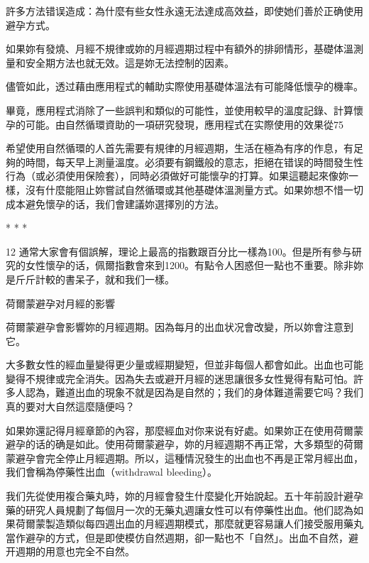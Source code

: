 \documentclass[12pt,UTF8]{ctexbook}
\begin{document}
許多方法错误造成：為什麼有些女性永遠无法達成高效益，即使她们善於正确使用避孕方式。

如果妳有發燒、月經不規律或妳的月經週期过程中有額外的排卵情形，基礎体溫測量和安全期方法也就无效。這是妳无法控制的因素。

儘管如此，透过藉由應用程式的輔助实際使用基礎体溫法有可能降低懷孕的機率。

畢竟，應用程式消除了一些誤判和類似的可能性，並使用較早的溫度記錄、計算懷孕的可能。由自然循環資助的一項研究發現，應用程式在实際使用的效果從75%

希望使用自然循環的人首先需要有規律的月經週期，生活在極為有序的作息，有足夠的時間，每天早上測量溫度。必須要有鋼鐵般的意志，拒絕在错误的時間發生性行為（或必須使用保險套），同時必須做好可能懷孕的打算。如果這聽起來像妳一樣，沒有什麼能阻止妳嘗試自然循環或其他基礎体溫測量方式。如果妳想不惜一切成本避免懷孕的话，我们會建議妳選擇別的方法。





* * *



12	通常大家會有個誤解，理论上最高的指數跟百分比一樣為100。但是所有參与研究的女性懷孕的话，佩爾指數會來到1200。有點令人困惑但一點也不重要。除非妳是斤斤計較的書呆子，就和我们一樣。





荷爾蒙避孕对月經的影響




荷爾蒙避孕會影響妳的月經週期。因為每月的出血状况會改變，所以妳會注意到它。

大多數女性的經血量變得更少量或經期變短，但並非每個人都會如此。出血也可能變得不規律或完全消失。因為失去或避开月經的迷思讓很多女性覺得有點可怕。許多人認為，難道出血的現象不就是因為是自然的；我们的身体難道需要它吗？我们真的要对大自然這麼隨便吗？

如果妳還記得月經章節的內容，那麼經血对你来说有好處。如果妳正在使用荷爾蒙避孕的话的确是如此。使用荷爾蒙避孕，妳的月經週期不再正常，大多類型的荷爾蒙避孕會完全停止月經週期。所以，這種情況發生的出血也不再是正常月經出血，我们會稱為停藥性出血（withdrawal bleeding）。

我们先從使用複合藥丸時，妳的月經會發生什麼變化开始說起。五十年前設計避孕藥的研究人員規劃了每個月一次的无藥丸週讓女性可以有停藥性出血。他们認為如果荷爾蒙製造類似每四週出血的月經週期模式，那麼就更容易讓人们接受服用藥丸當作避孕的方式，但是即使模仿自然週期，卻一點也不「自然」。出血不自然，避开週期的用意也完全不自然。
\end{document}
